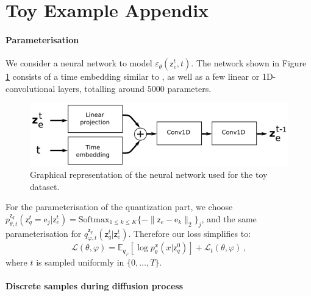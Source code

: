 \documentclass{article}
\theoremstyle{plain}
\theoremstyle{definition}
\theoremstyle{remark}
\newcommand{\latentcont}{\mathsf{z}_e}
\newcommand{\latentdis}{\mathsf{z}_q}
\newcommand{\rme}{\mathrm{e}}
\newcommand{\embed}{\rme}
\begin{document}
\section{Toy Example Appendix}
\label{ap:additionaltoy}

\paragraph{Parameterisation}

We consider a neural network to model  $\varepsilon_\theta(\latentcont^t ,t)$. The network shown in Figure  \ref{ap:fig:toynetwork} consists of a time embedding similar to \cite{ho2020denoising}, as well as a few linear or 1D-convolutional layers, totalling around $5000$ parameters.

\begin{figure}[h!]
    \centering
    \includegraphics[scale=2.0]{images/network_toy.png}
    \caption{Graphical representation of the neural network used for the toy dataset.}
    \label{ap:fig:toynetwork}
\end{figure}

For the parameterisation of the quantization part, we choose $p_{\theta,t}^{\latentdis}(\latentdis^{t}=\embed_j|\latentcont^{t}) = \mathrm{Softmax}_{1\leq k \leq K}\{-\|\latentcont - \embed_k\|_2\}_j$, and the same parameterisation for $q_{\varphi,t}^{\latentdis}(\latentdis^{t}|\latentcont^{t})$. Therefore our loss simplifies to:
$$
\mathcal{L}(\theta,\varphi) = \mathbb{E}_{q_{\varphi}}\left[\log p^x_{\theta}(x|\latentdis^{0})\right] +  \mathcal{L}_t(\theta,\varphi)\,,
$$
where $t$ is sampled uniformly in $\{0,\ldots,T\}$.

\paragraph{Discrete samples during diffusion process}
\end{document}
